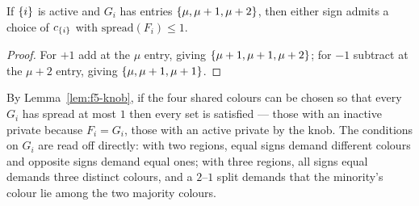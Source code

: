 \begin{lemma}
\label{lem:f5-knob2}
If $\left\{i\right\}$ is active and $G_i$ has entries $\left\{\mu,\mu+1,\mu+2\right\}$, then either
sign admits a choice of $c_{\left\{i\right\}}$ with $\mathrm{spread}(F_i) \le 1$.
\end{lemma}

\begin{proof}
For $+1$ add at the $\mu$ entry, giving $\left\{\mu+1,\mu+1,\mu+2\right\}$; for $-1$
subtract at the $\mu+2$ entry, giving $\left\{\mu,\mu+1,\mu+1\right\}$.
\end{proof}

By Lemma~\ref{lem:f5-knob}, if the four shared colours can be chosen so that
every $G_i$ has spread at most $1$ then every set is satisfied --- those with an
inactive private because $F_i = G_i$, those with an active private by the knob.
The conditions on $G_i$ are read off directly: with two regions, equal signs
demand different colours and opposite signs demand equal ones; with three
regions, all signs equal demands three distinct colours, and a $2$--$1$ split
demands that the minority's colour lie among the two majority colours.

